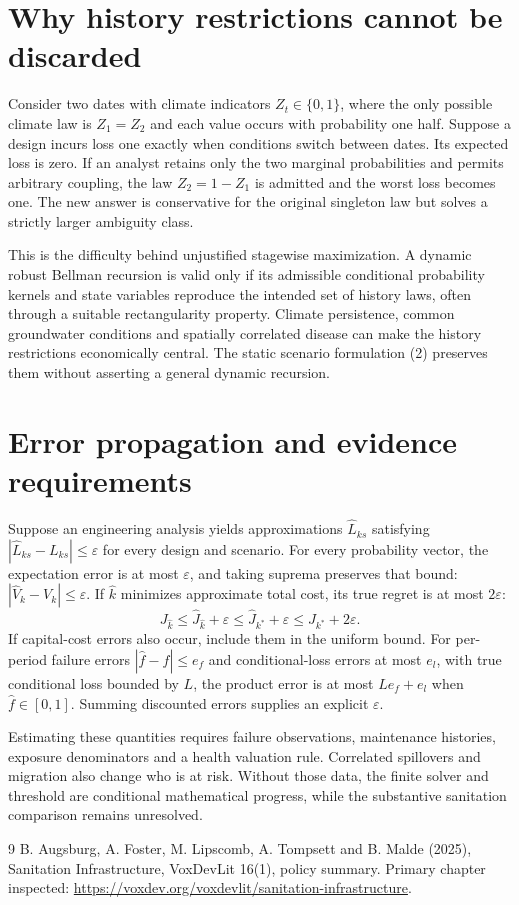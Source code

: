 \documentclass[11pt]{article}
\begin{document}
\section*{Why history restrictions cannot be discarded}
Consider two dates with climate indicators $Z_t\in\{0,1\}$, where the only possible climate law is $Z_1=Z_2$ and each value occurs with probability one half. Suppose a design incurs loss one exactly when conditions switch between dates. Its expected loss is zero. If an analyst retains only the two marginal probabilities and permits arbitrary coupling, the law $Z_2=1-Z_1$ is admitted and the worst loss becomes one. The new answer is conservative for the original singleton law but solves a strictly larger ambiguity class.

This is the difficulty behind unjustified stagewise maximization. A dynamic robust Bellman recursion is valid only if its admissible conditional probability kernels and state variables reproduce the intended set of history laws, often through a suitable rectangularity property. Climate persistence, common groundwater conditions and spatially correlated disease can make the history restrictions economically central. The static scenario formulation (2) preserves them without asserting a general dynamic recursion.

\section*{Error propagation and evidence requirements}
Suppose an engineering analysis yields approximations $\widehat L_{ks}$ satisfying $|\widehat L_{ks}-L_{ks}|\leq\varepsilon$ for every design and scenario. For every probability vector, the expectation error is at most $\varepsilon$, and taking suprema preserves that bound: $|\widehat V_k-V_k|\leq\varepsilon$. If $\widehat k$ minimizes approximate total cost, its true regret is at most $2\varepsilon$:
\[
 J_{\widehat k}\leq\widehat J_{\widehat k}+\varepsilon
 \leq\widehat J_{k^*}+\varepsilon\leq J_{k^*}+2\varepsilon.
\]
If capital-cost errors also occur, include them in the uniform bound. For per-period failure errors $|\widehat f-f|\leq e_f$ and conditional-loss errors at most $e_l$, with true conditional loss bounded by $L$, the product error is at most $Le_f+e_l$ when $\widehat f\in[0,1]$. Summing discounted errors supplies an explicit $\varepsilon$.

Estimating these quantities requires failure observations, maintenance histories, exposure denominators and a health valuation rule. Correlated spillovers and migration also change who is at risk. Without those data, the finite solver and threshold are conditional mathematical progress, while the substantive sanitation comparison remains unresolved.
\begin{thebibliography}{9}
 B. Augsburg, A. Foster, M. Lipscomb, A. Tompsett and B. Malde (2025), Sanitation Infrastructure, VoxDevLit 16(1), policy summary. Primary chapter inspected:
\url{https://voxdev.org/voxdevlit/sanitation-infrastructure}.
\end{thebibliography}
\end{document}
